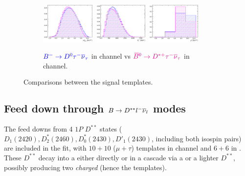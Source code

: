 \begin{figure}[!htb]
    \begin{subfigure}{\textwidth}
        \centering
        \includegraphics[width=0.3\textwidth]{figs-fit-fit-templates/histo-comp/D0_iso_D0Tau__vs__Dst_iso_DstTau__m2miss.pdf}
        \includegraphics[width=0.3\textwidth]{figs-fit-fit-templates/histo-comp/D0_iso_D0Tau__vs__Dst_iso_DstTau__el.pdf}
        \includegraphics[width=0.3\textwidth]{figs-fit-fit-templates/histo-comp/D0_iso_D0Tau__vs__Dst_iso_DstTau__q2.pdf}

        \caption{
            $\textcolor{blue}{{{{B}^-}} \rightarrow {\ensuremath{{D}^0}}{\ensuremath{\tau^-}}{\ensuremath{{\overline{\nu}}_\tau}}}$
            in \Dz channel
            vs
            $\textcolor{magenta}{{{\kern 0.18em\overline{\kern -0.18em B}}{}^0} \rightarrow {\ensuremath{{D}^{*+}}}{\ensuremath{\tau^-}}{\ensuremath{{\overline{\nu}}_\tau}}}$
            in \Dstar channel.
        }
    \end{subfigure}
    \caption{Comparisons between the signal templates.}
    \label{fig:d0-sig-vs-dst-sig}
\end{figure}


\subsection{Feed down through $B \rightarrow D^{**}{l^-}{{\overline{\nu}}_l}$ modes}
\label{tmpl:dstst}

The feed downs from 4 $1P$ $D^{**}$ states
($D_1(2420), D_2^*(2460), D_0^*(2430), D'_1(2430)$, including both isospin
pairs) are included in the fit,
with $10+10$ ($\mu+\tau$) templates in \Dz channel
and $6+6$ in \Dstar.
These $D^{**}$ decay into a \Dz either directly or in a
cascade via a \Dstar or a lighter $D^{**}$,
possibly producing two \emph{charged} \pion
(hence the \Dz\pion\pion templates).

